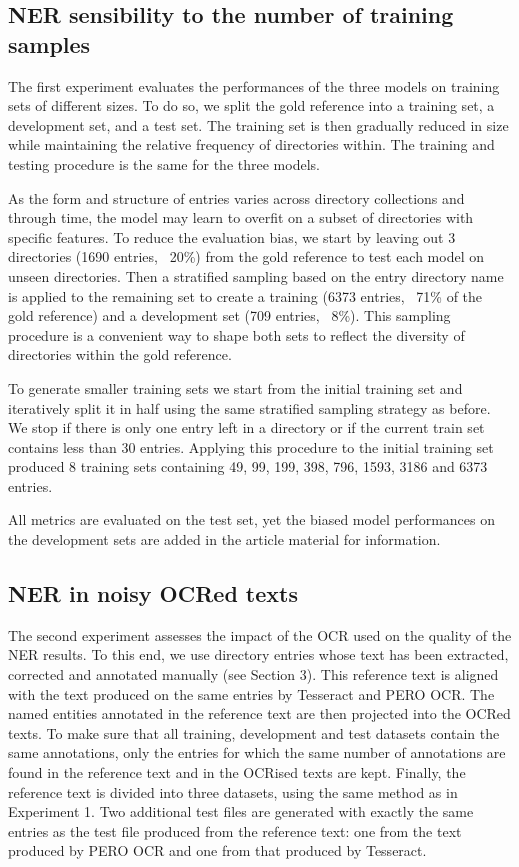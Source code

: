 \subsection{NER sensibility to the number of training samples}
\label{subsection:experiment-1}
The first experiment evaluates the performances of the three models on training sets of different sizes.
To do so, we split the gold reference into a training set, a development set, and a test set. The training set is then gradually reduced in size while maintaining the relative frequency of directories within.
The training and testing procedure is the same for the three models.

As the form and structure of entries varies across directory collections and through time, the model may learn to overfit on a subset of directories with specific features.
To reduce the evaluation bias, we start by leaving out 3 directories (1690 entries, ~20\%) from the gold reference to test each model on unseen directories.
Then a stratified sampling based on the entry directory name is applied to the remaining set to create a training (6373 entries, ~71\% of the gold reference) and a development set (709 entries, ~8\%).
This sampling procedure is a convenient way to shape both sets to reflect the diversity of directories within the gold reference.

To generate smaller training sets we start from the initial training set and iteratively split it in half using the same stratified sampling strategy as before.
We stop if there is only one entry left in a directory or if the current train set contains less than 30 entries.
Applying this procedure to the initial training set produced 8 training sets containing 49, 99, 199, 398, 796, 1593, 3186 and 6373 entries.

All metrics are evaluated on the test set, yet the biased model performances on the development sets are added in the article material for information.





\subsection{NER in noisy OCRed texts}
\label{subsection:experiment-2}
The second experiment assesses the impact of the OCR used on the quality of the NER results. To this end, we use directory entries whose text has been extracted, corrected and annotated manually (see Section 3). This reference text is aligned with the text produced on the same entries by Tesseract and PERO OCR. The named entities annotated in the reference text are then projected into the OCRed texts. To make sure that all training, development and test datasets contain the same annotations, only the entries for which the same number of annotations are found in the reference text and in the OCRised texts are kept. Finally, the reference text is divided into three datasets, using the same method as in Experiment 1. Two additional test files are generated with exactly the same entries as the test file produced from the reference text: one from the text produced by PERO OCR and one from that produced by Tesseract.





